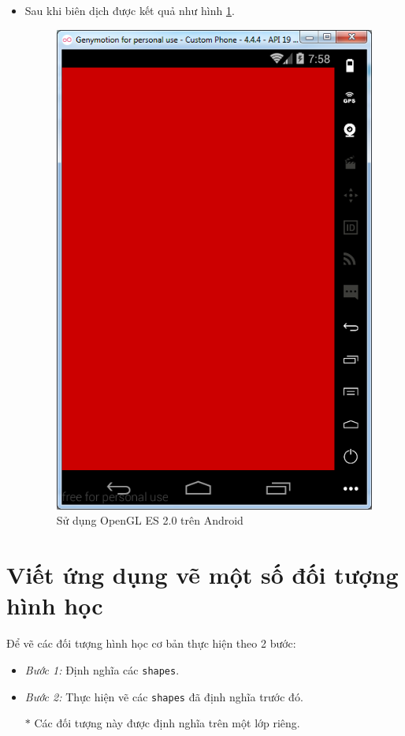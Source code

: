 \documentclass[13pt,a4paper]{extreport}
\begin{document}
\begin{itemize}
		\item Sau khi biên dịch được kết quả như hình \ref{Fig:opengles-1}.
			\begin{figure}[!h]
				\begin{center}
					\includegraphics[scale=.6]{opengles-1.png}
				\end{center}
				\caption{Sử dụng OpenGL ES 2.0 trên Android} \label{Fig:opengles-1}
			\end{figure}						
	\end{itemize}

\newpage	
\section{Viết ứng dụng vẽ một số đối tượng hình học}
	Để vẽ các đối tượng hình học cơ bản thực hiện theo 2 bước:
		\begin{itemize}
			\item \emph{Bước 1:} Định nghĩa các \verb|shapes|.
			
			\item \emph{Bước 2:} Thực hiện vẽ các \verb|shapes| đã định nghĩa trước đó.
			
			\item[$\ast$] Các đối tượng này được định nghĩa trên một lớp riêng.
		\end{itemize}
\end{document}
